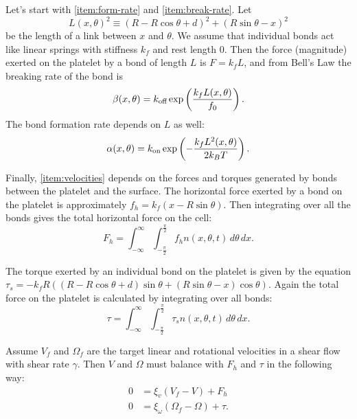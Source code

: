 \documentclass{article}
\newcommand{\dd}{d}
\newcommand{\Int}[4]{\int_{#3}^{#4} #1 \, \dd #2}
\newcommand{\tn}{\textnormal}
\begin{document}
Let's start with \ref{item:form-rate} and \ref{item:break-rate}. Let
\begin{equation}
  \label{eq:length}
  L(x,\theta)^2 \equiv (R - R\cos\theta + d)^2 + (R\sin\theta - x)^2
\end{equation}
be the length of a link between $x$ and $\theta$. We assume that
individual bonds act like linear springs with stiffness $k_f$ and rest
length 0. Then the force (magnitude) exerted on the platelet by a bond
of length $L$ is $F = k_f L$, and from Bell's Law the breaking rate of
the bond is 
\begin{equation}
  \label{eq:breaking-rate}
  \beta(x,\theta) = k_\tn{off} \exp\left( \frac{k_f L(x, \theta)}{f_0} \right). 
\end{equation}
The bond formation rate depends on $L$ as well: 
\begin{equation}
  \label{eq:formation-rate}
  \alpha(x, \theta) = k_\tn{on} \exp\left( -\frac{k_f L^2(x,
      \theta)}{2k_B T} \right).
\end{equation}

Finally, \ref{item:velocities} depends on the forces and torques
generated by bonds between the platelet and the surface. The
horizontal force exerted by a bond on the platelet is approximately
$f_h = k_f (x - R \sin\theta)$. Then integrating over all the bonds
gives the total horizontal force on the cell: 
\begin{equation}
  \label{eq:total-force}
  F_h = \Int{ \Int{f_h n(x,\theta,t)}{ \theta }{ -\frac{\pi}{2} }{
      \frac{\pi}{2}} }{ x }{ -\infty }{ \infty }.
\end{equation}

The torque exerted by an individual bond on the platelet is given by
the equation $\tau_s = -k_f R((R - R \cos\theta + d) \sin\theta + (R
\sin\theta - x) \cos\theta)$. Again the total force on the platelet is
calculated by integrating over all bonds:
\begin{equation}
  \label{eq:total-torque}
  \tau = \Int{ \Int{\tau_s n(x,\theta,t)}{ \theta }{ -\frac{\pi}{2} }{
      \frac{\pi}{2}} }{ x }{ -\infty }{ \infty }.
\end{equation}

Assume $V_f$ and $\Omega_f$ are the target linear and
rotational velocities in a shear flow with shear rate $\gamma$. Then
$V$ and $\Omega$ must balance with $F_h$ and $\tau$ in the following way:
\begin{align}
  \label{eq:vel}
  0 &= \xi_v (V_f - V) + F_h \\
  \label{eq:angvel}
  0 &= \xi_\omega (\Omega_f - \Omega) + \tau.
\end{align}
\end{document}
